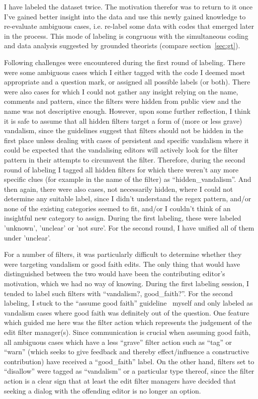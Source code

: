 I have labeled the dataset twice.
The motivation therefor was to return to it once I've gained better insight into the data and use this newly gained knowledge to re-evaluate ambiguous cases, i.e. re-label some data with codes that emerged later in the process.
This mode of labeling is congruous with the simultaneous coding and data analysis suggested by grounded theorists (compare section~\ref{sec:gt}).

Following challenges were encountered during the first round of labeling.
There were some ambiguous cases which I either tagged with the code I deemed most appropriate and a question mark, or assigned all possible labels (or both).
There were also cases for which I could not gather any insight relying on the name, comments and pattern, since the filters were hidden from public view and the name was not descriptive enough.
However, upon some further reflection, I think it is safe to assume that all hidden filters target a form of (more or less grave) vandalism, since the guidelines suggest that filters should not be hidden in the first place unless dealing with cases of persistent and specific vandalism where it could be expected that the vandalising editors will actively look for the filter pattern in their attempts to circumvent the filter\cite{Wikipedia:EditFilter}.
Therefore, during the second round of labeling I tagged all hidden filters for which there weren't any more specific clues (for example in the name of the filter) as ``hidden\_vandalism''.
And then again, there were also cases, not necessarily hidden, where I could not determine any suitable label, since I didn't understand the regex pattern, and/or none of the existing categories seemed to fit, and/or I couldn't think of an insightful new category to assign.
During the first labeling, these were labeled 'unknown', 'unclear' or 'not sure'.
For the second round, I have unified all of them under 'unclear'.

For a number of filters, it was particularly difficult to determine whether they were targeting vandalism or good faith edits.
The only thing that would have distinguished between the two would have been the contributing editor's motivation, which we had no way of knowing.
During the first labeling session, I tended to label such filters with ``vandalism?, good\_faith?''.
For the second labeling, I stuck to the ``assume good faith'' guideline~\cite{Wikipedia:GoodFaith} myself
and only labeled as vandalism cases where good faith was definitely out of the question.
One feature which guided me here was the filter action which represents the judgement of the edit filter manager(s).
Since communication is crucial when assuming good faith, all ambiguous cases which have a less ``grave'' filter action such as ``tag'' or ``warn'' (which seeks to give feedback and thereby effect/influence a constructive contribution) have received a ``good\_faith'' label.
On the other hand, filters set to ``disallow'' were tagged as ``vandalism'' or a particular type thereof, since the filter action is a clear sign that at least the edit filter managers have decided that seeking a dialog with the offending editor is no longer an option. %

